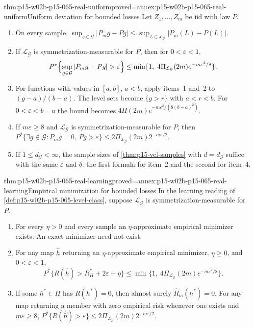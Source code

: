 \begin{hbtheorem}{thm:p15-w02b-p15-065-real-uniform}{proved=annex:p15-w02b-p15-065-real-uniform}{Uniform deviation for bounded losses}
Let \(Z_1,\ldots,Z_m\) be iid with law \(P\).
\begin{enumerate}
\item On every sample,
      \(\sup_{g\in\mathcal G}|P_mg-Pg|\leq
      \sup_{L\in\mathcal L_{\mathcal G}}|P_m(L)-P(L)|\).
\item If \(\mathcal L_{\mathcal G}\) is symmetrization-\allowbreak measurable for \(P\),
      then for \(0<\varepsilon<1\),
      \[
       P^{*}\Bigl\{\sup_{g\in\mathcal G}|P_mg-Pg|>\varepsilon\Bigr\}
       \leq\min\{1,\ 4\Pi_{\mathcal L_{\mathcal G}}(2m)e^{-m\varepsilon^2/8}\}.
      \]
\item For functions with values in \([a,b]\), \(a<b\), apply items~1
      and~2 to \((g-a)/(b-a)\). The level sets become
      \(\{g>r\}\) with \(a<r<b\). For \(0<\varepsilon<b-a\) the bound
      becomes \(4\Pi(2m)e^{-m\varepsilon^2/(8(b-a)^2)}\).
\item If \(m\varepsilon\geq8\) and \(\mathcal L_{\mathcal G}\) is
      symmetrization-\allowbreak measurable for \(P\), then
      \(P^{*}\{\exists g\in\mathcal G:P_mg=0,\ Pg>\varepsilon\}
      \leq2\Pi_{\mathcal L_{\mathcal G}}(2m)2^{-m\varepsilon/2}\).
\item If \(1\leq d_{\mathcal G}<\infty\), the sample sizes of
      \cref{thm:p15-vcl-samples} with \(d=d_{\mathcal G}\) suffice with the
      same \(\varepsilon\) and \(\delta\): the first formula for item~2 and
      the second for item~4.
\end{enumerate}
\end{hbtheorem}

\begin{hbtheorem}{thm:p15-w02b-p15-065-real-learning}{proved=annex:p15-w02b-p15-065-real-learning}{Empirical minimization for bounded losses}
In the learning reading of \cref{def:p15-w02b-p15-065-level-class},
suppose \(\mathcal L_{\mathcal G}\) is symmetrization-\allowbreak measurable for \(P\).
\begin{enumerate}
\item For every \(\eta>0\) and every sample an \(\eta\)-approximate
      empirical minimizer exists. An exact minimizer need not exist.
\item For any map \(\widehat h\) returning an \(\eta\)-approximate
      empirical minimizer, \(\eta\geq0\), and \(0<\varepsilon<1\),
      \[
       P^{*}\{R(\widehat h)>R_H^{*}+2\varepsilon+\eta\}
       \leq\min\{1,\ 4\Pi_{\mathcal L_{\mathcal G}}(2m)e^{-m\varepsilon^2/8}\}.
      \]
\item If some \(h^{*}\in H\) has \(R(h^{*})=0\), then almost surely
      \(\widehat R_m(h^{*})=0\). For any map returning a member with zero
      empirical risk whenever one exists and \(m\varepsilon\geq8\),
      \(P^{*}\{R(\widehat h)>\varepsilon\}
      \leq2\Pi_{\mathcal L_{\mathcal G}}(2m)2^{-m\varepsilon/2}\).
\end{enumerate}
\end{hbtheorem}

